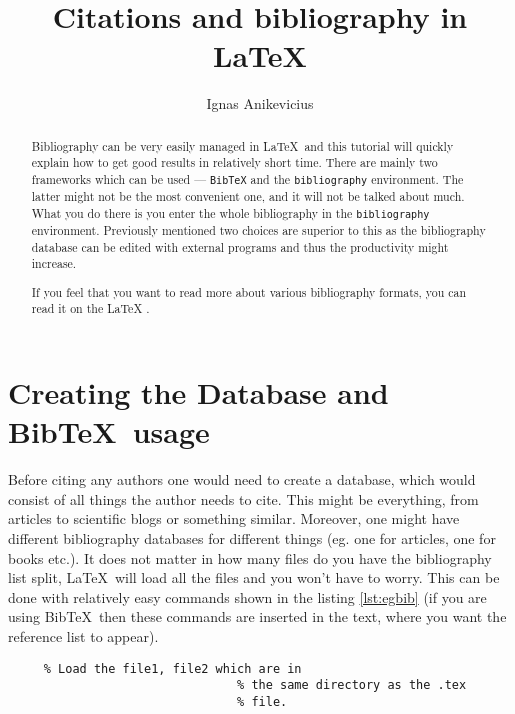 

\usepackage[printonlyused]{acronym}

\title{Citations and bibliography in \LaTeX{}}
\author{Ignas Anikevicius}
\date{}



\maketitle

\begin{abstract}
    Bibliography can be very easily managed in \LaTeX\ and this tutorial will
    quickly explain how to get good results in relatively short time.  There are
    mainly two frameworks which can be used --- \verb|BibTeX| and the
    \verb|bibliography| environment. The latter might not be the most convenient
    one, and it will not be talked about much. What you do there is you enter
    the whole bibliography in the \verb|bibliography| environment. Previously
    mentioned two choices are superior to this as the bibliography database can
    be edited with external programs and thus the productivity might increase.

    If you feel that you want to read more about various bibliography formats,
    you can read it on the LaTeX
    .\cite{latexwikibook:bibliography}
\end{abstract}

\tableofcontents

\section{Creating the Database and Bib\TeX\ usage}

Before citing any authors one would need to create a database, which would
consist of all things the author needs to cite. This might be everything, from
articles to scientific blogs or something similar. Moreover, one might have
different bibliography databases for different things (eg. one for articles, one
for books etc.). It does not matter in how many files do you have the
bibliography list split, \LaTeX\ will load all the files and you won't have to
worry. This can be done with relatively easy commands shown in the listing
\ref{lst:egbib} (if you are using Bib\TeX\ then these commands are inserted in
the text, where you want the reference list to appear).
\begin{lstlisting}[caption={Example code to get BibTeX working},label=lst:egbib]
       % Load the plain style
     % Load the file1, file2 which are in
                                % the same directory as the .tex
                                % file.
\end{lstlisting}

